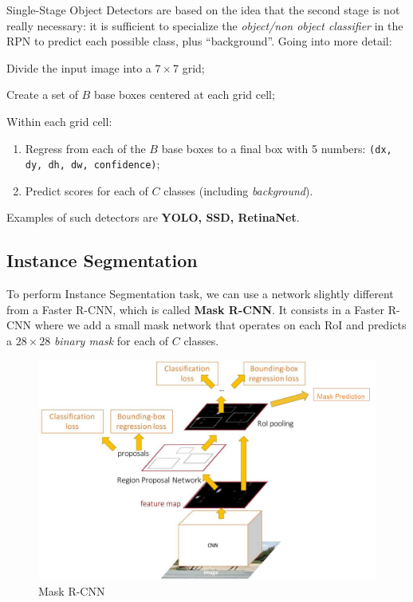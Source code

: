 Single-Stage Object Detectors are based on the idea that the second stage is not really necessary: it is sufficient to specialize the \textit{object/non object classifier} in the RPN to predict each possible class, plus ``background''. Going into more detail:
\begin{myenum}
    \item Divide the input image into a $7 \times 7$ grid;
    \item Create a set of $B$ base boxes centered at each grid cell;
    \item Within each grid cell:
    \begin{enumerate}
        \item Regress from each of the $B$ base boxes to a final box with 5 numbers: \texttt{(dx, dy, dh, dw, confidence)};
        \item Predict scores for each of $C$ classes (including \textit{background}).
    \end{enumerate}
\end{myenum}

Examples of such detectors are \textbf{YOLO, SSD, RetinaNet}.


\subsection{Instance Segmentation}\label{sec:ds-instance}

To perform Instance Segmentation task, we can use a network slightly different from a Faster R-CNN, which is called \textbf{Mask R-CNN}. It consists in a Faster R-CNN where we add a small mask network that operates on each RoI and predicts a $28 \times 28$ \textit{binary mask} for each of $C$ classes.

\begin{figure}[h!]
    \centering
    \includegraphics[width=0.7\linewidth]{images/mask-rcnn}
    \caption[Mask R-CNN]{Mask R-CNN}
    \label{fig:mask-rcnn}
\end{figure}

